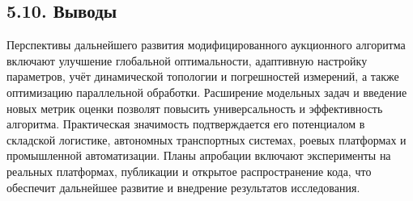 \subsection*{5.10. Выводы}
Перспективы дальнейшего развития модифицированного аукционного алгоритма включают улучшение глобальной оптимальности, адаптивную настройку параметров, учёт динамической топологии и погрешностей измерений, а также оптимизацию параллельной обработки. Расширение модельных задач и введение новых метрик оценки позволят повысить универсальность и эффективность алгоритма. Практическая значимость подтверждается его потенциалом в складской логистике, автономных транспортных системах, роевых платформах и промышленной автоматизации. Планы апробации включают эксперименты на реальных платформах, публикации и открытое распространение кода, что обеспечит дальнейшее развитие и внедрение результатов исследования.